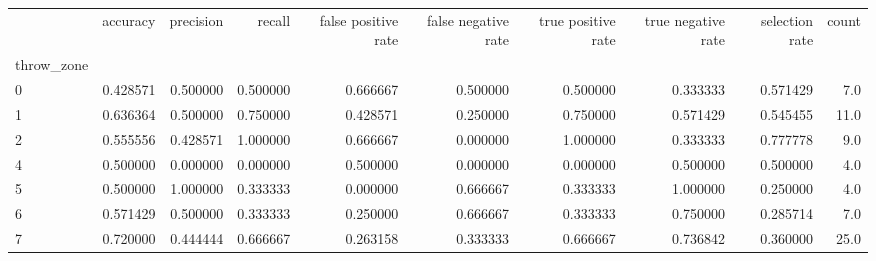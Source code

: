 \begin{tabular}{lrrrrrrrrr}
\toprule
{} &  accuracy &  precision &    recall &  false positive rate &  false negative rate &  true positive rate &  true negative rate &  selection rate &  count \\
throw\_zone &           &            &           &                      &                      &                     &                     &                 &        \\
\midrule
0          &  0.428571 &   0.500000 &  0.500000 &             0.666667 &             0.500000 &            0.500000 &            0.333333 &        0.571429 &    7.0 \\
1          &  0.636364 &   0.500000 &  0.750000 &             0.428571 &             0.250000 &            0.750000 &            0.571429 &        0.545455 &   11.0 \\
2          &  0.555556 &   0.428571 &  1.000000 &             0.666667 &             0.000000 &            1.000000 &            0.333333 &        0.777778 &    9.0 \\
4          &  0.500000 &   0.000000 &  0.000000 &             0.500000 &             0.000000 &            0.000000 &            0.500000 &        0.500000 &    4.0 \\
5          &  0.500000 &   1.000000 &  0.333333 &             0.000000 &             0.666667 &            0.333333 &            1.000000 &        0.250000 &    4.0 \\
6          &  0.571429 &   0.500000 &  0.333333 &             0.250000 &             0.666667 &            0.333333 &            0.750000 &        0.285714 &    7.0 \\
7          &  0.720000 &   0.444444 &  0.666667 &             0.263158 &             0.333333 &            0.666667 &            0.736842 &        0.360000 &   25.0 \\
\bottomrule
\end{tabular}
